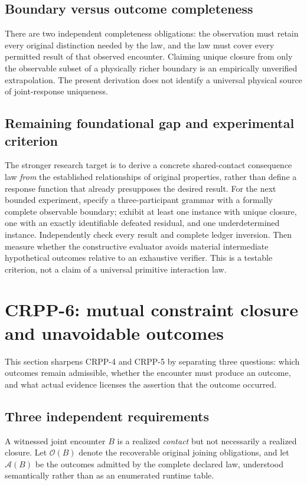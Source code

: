 \documentclass[11pt]{article}
\begin{document}
\subsection{Boundary versus outcome completeness}
There are two independent completeness obligations:
the observation must retain every original distinction
needed by the law, and the law must cover every permitted
result of that observed encounter. Claiming unique closure
from only the observable subset of a physically richer
boundary is an empirically unverified extrapolation.
The present derivation does not identify a universal
physical source of joint-response uniqueness.

\subsection{Remaining foundational gap and experimental criterion}
The stronger research target is to derive a concrete
shared-contact consequence law \emph{from} the established
relationships of original properties, rather than define
a response function that already presupposes the desired
result. For the next bounded experiment, specify a
three-participant grammar with a formally complete
observable boundary; exhibit at least one instance with
unique closure, one with an exactly identifiable defeated
residual, and one underdetermined instance. Independently
check every result and complete ledger inversion. Then
measure whether the constructive evaluator avoids material
intermediate hypothetical outcomes relative to an
exhaustive verifier. This is a testable criterion, not a
claim of a universal primitive interaction law.


\section{CRPP-6: mutual constraint closure and unavoidable outcomes}
\label{sec:crpp6}
This section sharpens CRPP-4 and CRPP-5 by separating three
questions: which outcomes remain admissible, whether the
encounter must produce an outcome, and what actual evidence
licenses the assertion that the outcome occurred.

\subsection{Three independent requirements}
A witnessed joint encounter $B$ is a realized \emph{contact}
but not necessarily a realized closure. Let $\mathcal O(B)$
denote the recoverable original joining obligations, and
let $\mathcal A(B)$ be the outcomes admitted by the complete
declared law, understood semantically rather than as an
enumerated runtime table.
\end{document}
